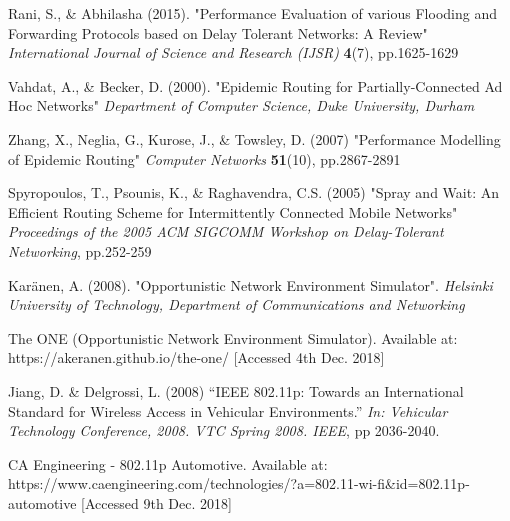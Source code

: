 \documentclass{article}
\begin{document}
\begin{thebibliography}{20}
Rani, S., \& Abhilasha (2015).
"Performance Evaluation of various Flooding and
Forwarding Protocols based on Delay Tolerant
Networks: A Review"
\textit{International Journal of Science and Research (IJSR)} \textbf{4}(7), pp.1625-1629

Vahdat, A., \& Becker, D. (2000).
"Epidemic Routing for Partially-Connected Ad Hoc Networks"
\textit{Department of Computer Science, Duke University, Durham}

Zhang, X., Neglia, G., Kurose, J., \& Towsley, D. (2007)
"Performance Modelling of Epidemic Routing"
\textit{Computer Networks} \textbf{51}(10), pp.2867-2891

Spyropoulos, T., Psounis, K., \& Raghavendra, C.S. (2005)
"Spray and Wait: An Efficient Routing Scheme for
Intermittently Connected Mobile Networks"
\textit{Proceedings of the 2005 ACM SIGCOMM Workshop on Delay-Tolerant Networking}, pp.252-259

Karänen, A. (2008).
"Opportunistic Network Environment Simulator".
\textit{Helsinki University of Technology, Department of Communications and Networking}

The ONE (Opportunistic Network Environment Simulator). Available at: https://akeranen.github.io/the-one/ [Accessed 4th Dec. 2018]

Jiang, D. \& Delgrossi, L. (2008)
``IEEE 802.11p: Towards an International Standard for Wireless Access in Vehicular Environments.'' 
\textit{In: Vehicular Technology Conference, 2008. VTC Spring 2008. IEEE}, pp 2036-2040.

CA Engineering - 802.11p Automotive. Available at: https://www.caengineering.com/technologies/?a=802.11-wi-fi&id=802.11p-automotive [Accessed 9th Dec. 2018]

\end{thebibliography}
 
\end{document}
